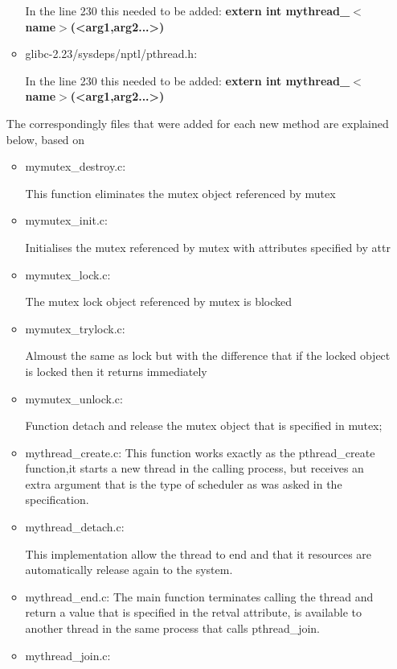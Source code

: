 \documentclass[a4paper,9pt]{article}
\begin{document}
\begin{itemize}
\begin{itemize}
In the line 230 this needed to be added: \textbf{extern int mythread\_$<$name$>$(<arg1,arg2...>)}

\item glibc-2.23/sysdeps/nptl/pthread.h:

In the line 230 this needed to be added:  \textbf{extern int mythread\_$<$name$>$(<arg1,arg2...>)}

\end{itemize}
The correspondingly files that were added for each new method are explained below, based on \cite{butenhof1997programming}
\begin{itemize}
\item mymutex\_destroy.c: 

This function eliminates the mutex object referenced by mutex 

\item mymutex\_init.c: 

Initialises the mutex referenced by mutex with attributes specified by attr

\item mymutex\_lock.c:

The mutex lock object referenced by mutex is blocked

\item mymutex\_trylock.c:

Almoust the same as lock but with the difference that if the locked object is locked then it returns immediately

\item mymutex\_unlock.c:

Function detach and release the mutex object that is specified in mutex;


\item mythread\_create.c: This function works exactly as the pthread\_create function,it starts a new thread in the calling process, but receives an extra argument that is the type of scheduler as was asked in the specification.  
\item mythread\_detach.c:

This implementation allow the thread to end and that it resources are automatically release again to the system.

\item mythread\_end.c: The main function terminates calling the thread and return a value that is specified in the retval attribute, is available to another thread in the same process that calls pthread\_join.

\item mythread\_join.c:


\end{itemize}
\end{itemize}
\end{document}

